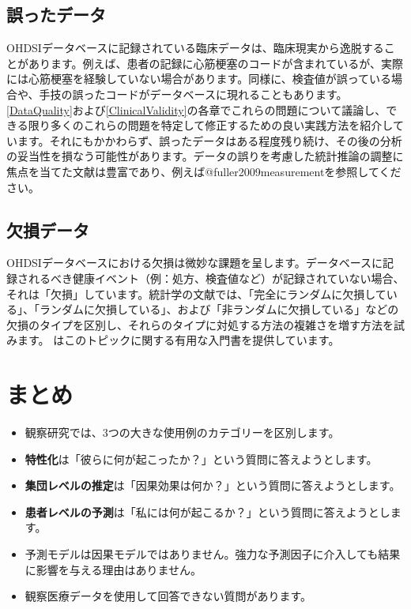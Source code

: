 \documentclass[
  11pt]{book}
\makeatletter
\newenvironment{kframe}{%
\medskip{}
\setlength{\fboxsep}{.8em}
 \def\at@end@of@kframe{}%
 \ifinner\ifhmode%
  \def\at@end@of@kframe{\end{minipage}}%
  \begin{minipage}{\columnwidth}%
 \fi\fi%
 \def\FrameCommand##1{\hskip\@totalleftmargin \hskip-\fboxsep
 \colorbox{myShadeColor}{##1}\hskip-\fboxsep
     \hskip-\linewidth \hskip-\@totalleftmargin \hskip\columnwidth}%
 \MakeFramed {\advance\hsize-\width
   \@totalleftmargin\z@ \linewidth\hsize
   \@setminipage}}%
 {\par\unskip\endMakeFramed%
 \at@end@of@kframe}
\newenvironment{rmdblock}[1]
  {
  \begin{itemize}
  \renewcommand{\labelitemi}{
    \raisebox{-.7\height}[0pt][0pt]{
      {\setkeys{Gin}{width=3em,keepaspectratio}\texttt{[image: images/\#1]}}
    }
  }
  \setlength{\fboxsep}{1em}
  \begin{kframe}
  \item
  }
  {
  \end{kframe}
  \end{itemize}
  }
\newenvironment{rmdsummary}
  {\begin{rmdblock}{summary}}
  {\end{rmdblock}}
\theoremstyle{definition}
\theoremstyle{definition}
\theoremstyle{definition}
\theoremstyle{definition}
\theoremstyle{remark}
\makeatother
\begin{document}
\subsection{誤ったデータ}\label{ux8aa4ux3063ux305fux30c7ux30fcux30bf}

OHDSIデータベースに記録されている臨床データは、臨床現実から逸脱することがあります。例えば、患者の記録に心筋梗塞のコードが含まれているが、実際には心筋梗塞を経験していない場合があります。同様に、検査値が誤っている場合や、手技の誤ったコードがデータベースに現れることもあります。\ref{DataQuality}および\ref{ClinicalValidity}の各章でこれらの問題について議論し、できる限り多くのこれらの問題を特定して修正するための良い実践方法を紹介しています。それにもかかわらず、誤ったデータはある程度残り続け、その後の分析の妥当性を損なう可能性があります。データの誤りを考慮した統計推論の調整に焦点を当てた文献は豊富であり、例えば@fuller2009measurementを参照してください。

\subsection{欠損データ}\label{ux6b20ux640dux30c7ux30fcux30bf}


OHDSIデータベースにおける欠損は微妙な課題を呈します。データベースに記録されるべき健康イベント（例：処方、検査値など）が記録されていない場合、それは「欠損」しています。統計学の文献では、「完全にランダムに欠損している」、「ランダムに欠損している」、および「非ランダムに欠損している」などの欠損のタイプを区別し、それらのタイプに対処する方法の複雑さを増す方法を試みます。\citet{perkins2017principled} はこのトピックに関する有用な入門書を提供しています。

\section{まとめ}\label{ux307eux3068ux3081-5}

\begin{rmdsummary}
\begin{itemize}
\item
  観察研究では、3つの大きな使用例のカテゴリーを区別します。
\item
  \textbf{特性化}は「彼らに何が起こったか？」という質問に答えようとします。
\item
  \textbf{集団レベルの推定}は「因果効果は何か？」という質問に答えようとします。
\item
  \textbf{患者レベルの予測}は「私には何が起こるか？」という質問に答えようとします。
\item
  予測モデルは因果モデルではありません。強力な予測因子に介入しても結果に影響を与える理由はありません。
\item
  観察医療データを使用して回答できない質問があります。
\end{itemize}
\end{rmdsummary}
\end{document}
